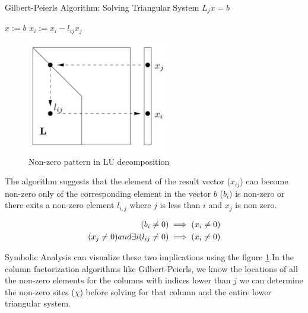 \begin{algorithm}[H]
    \caption{Gilbert-Peierls Algorithm: Solving Triangular System $L_j x = b$
        \label{algo:GP_tri}}
    \begin{algorithmic}[1]
        \Statex
        \State $x := b$
                \State $x_i := x_i - l_{ij} x_j$
            \EndFor
        \EndFor
    \end{algorithmic}
\end{algorithm}

\begin{figure}[H]
    \centering
    \includegraphics[width = 0.55\textwidth]{./Theory/nnzPattern.JPG}
    \caption{Non-zero pattern in LU decomposition}
    \label{fig:GP:nnzPattern}
\end{figure}

The algorithm suggests that the element of the result vector ($x_{ij}$) can become non-zero only of the corresponding element in the vector $b$ ($b_{i}$) is non-zero or there exits a non-zero element $l_{i,j}$ where $j$ is less than $i$ and $x_{j}$ is non zero. 

\begin{subequations}
    \centering
    \begin{align}
        (b_i \neq 0) &\implies (x_i \neq 0) \\
        (x_j \neq 0) and \exists i(l_{ij} \neq 0) &\implies (x_i \neq 0)
    \end{align}
    \label{eqn:GP:findingX}
\end{subequations}

Symbolic Analysis can visualize these two implications using the figure \ref{fig:GP:nnzPattern}.In the column factorization algorithms like Gilbert-Peierls, we know the locations of all the non-zero elements for the columns with indices lower than $j$ we can determine the non-zero sites ($\chi$) before solving for that column and the entire
lower triangular system.

